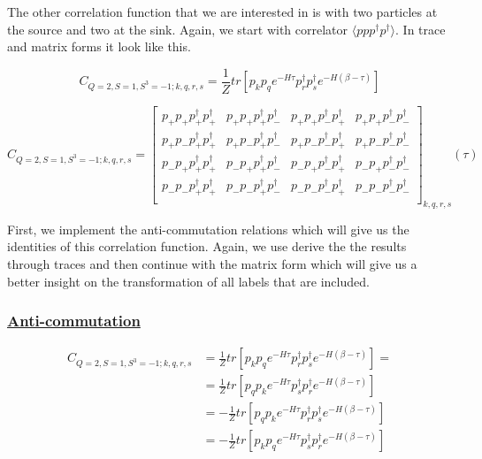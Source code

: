 The other correlation function that we are interested in is with two particles at the source and two at the sink. Again, we start with correlator $\langle ppp^\dagger p^\dagger\rangle$. In trace and matrix forms it look like this.

\begin{equation}
  C_{Q=2,S=1,S^3=-1;k,q,r,s} = \frac{1}{Z}tr\left[p_kp_qe^{-H\tau}p^\dagger_rp^\dagger_se^{-H\left(\beta-\tau\right)}\right]
\end{equation}

\renewcommand{\cor}[4]{p_{#1}p_{#2}p^\dagger_{#3}p^\dagger_{#4}}
\begin{equation}
  C_{Q=2,S=1,S^3=-1;k,q,r,s} =
  \left[
  \begin{array}{cccc}
    \cor{+}{+}{+}{+} & \cor{+}{+}{+}{-} & \cor{+}{+}{-}{+} & \cor{+}{+}{-}{-} \\
    \cor{+}{-}{+}{+} & \cor{+}{-}{+}{-} & \cor{+}{-}{-}{+} & \cor{+}{-}{-}{-} \\
    \cor{-}{+}{+}{+} & \cor{-}{+}{+}{-} & \cor{-}{+}{-}{+} & \cor{-}{+}{-}{-} \\
    \cor{-}{-}{+}{+} & \cor{-}{-}{+}{-} & \cor{-}{-}{-}{+} & \cor{-}{-}{-}{-} \\
  \end{array}
  \right]_{k,q,r,s} (\tau)
\end{equation}

First, we implement the anti-commutation relations which will give us the identities of this correlation function. Again, we use derive the the results through traces and then continue with the matrix form which will give us a better insight on the transformation of all labels that are included.

\subsubsection{\underline{Anti-commutation}}

\begin{equation}
  \begin{aligned}
    C_{Q=2,S=1,S^3=-1;k,q,r,s} &= \frac{1}{Z}tr\left[p_kp_qe^{-H\tau}p^\dagger_rp^\dagger_se^{-H\left(\beta-\tau\right)}\right] =\\
    &= \frac{1}{Z}tr\left[p_qp_ke^{-H\tau}p^\dagger_sp^\dagger_re^{-H\left(\beta-\tau\right)}\right] \\
    &= - \frac{1}{Z}tr\left[p_qp_ke^{-H\tau}p^\dagger_rp^\dagger_se^{-H\left(\beta-\tau\right)}\right] \\
    &= - \frac{1}{Z}tr\left[p_kp_qe^{-H\tau}p^\dagger_sp^\dagger_re^{-H\left(\beta-\tau\right)}\right]
  \end{aligned}
\end{equation}

